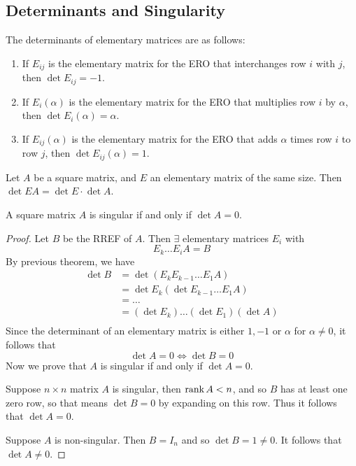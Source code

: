 \documentclass{article}
\begin{document}
\subsection{Determinants and Singularity}
\begin{theorem}
  The determinants of elementary matrices are as follows:
  \begin{enumerate}
    \item If $E_{ij}$ is the elementary matrix for the ERO that interchanges row $i$ with $j$, then $\det E_{ij} = -1$.
    \item If $E_i(\alpha)$ is the elementary matrix for the ERO that multiplies row $i$ by $\alpha$, then $\det E_i(\alpha) = \alpha$.
    \item If $E_{ij}(\alpha)$ is the elementary matrix for the ERO that adds $\alpha$ times row $i$ to row $j$, then $\det E_{ij}(\alpha) = 1$.
  \end{enumerate}
\end{theorem}
\begin{theorem}
  Let $A$ be a square matrix, and $E$ an elementary matrix of the same size. Then $\det EA = \det E \cdot \det A$.
\end{theorem}
\begin{theorem}
  A square matrix $A$ is singular if and only if $\det A = 0$.
\end{theorem}
\begin{proof}
  Let $B$ be the RREF of $A$. Then $\exists$ elementary matrices $E_i$ with \[
    E_k\dots E_iA = B
  \]
  By previous theorem, we have
  \begin{align*}
    \det B & = \det (E_kE_{k-1}\dots E_1A)       \\
           & = \det E_k (\det E_{k-1}\dots E_1A) \\
           & = \dots                             \\
           & = (\det E_k)\dots(\det E_1)(\det A) \\
  \end{align*}
  Since the determinant of an elementary matrix is either $1, -1$ or $\alpha$ for $\alpha \neq 0$, it follows that \[
    \det A = 0 \iff \det B = 0
  \]
  Now we prove that $A$ is singular if and only if $\det A = 0$.

  Suppose $n \times n$ matrix $A$ is singular, then $\rank A < n$, and so $B$ has at least one zero row, so that means $\det B = 0$ by expanding on this row. Thus it follows that $\det A = 0$.

  Suppose $A$ is non-singular. Then $B = I_n$ and so $\det B = 1 \neq 0$. It follows that $\det A \neq 0$.
\end{proof}
\end{document}
